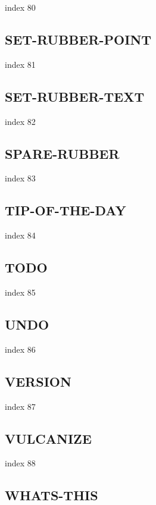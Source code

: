 \documentclass[11pt]{report}
\begin{document}
index 80

\subsection{SET-RUBBER-POINT}

index 81

\subsection{SET-RUBBER-TEXT}

index 82

\subsection{SPARE-RUBBER}

index 83

\subsection{TIP-OF-THE-DAY}

index 84

\subsection{TODO}

 index 85

\subsection{UNDO}

 index 86

\subsection{VERSION}

index 87

\subsection{VULCANIZE}

index 88

\subsection{WHATS-THIS}
\end{document}
